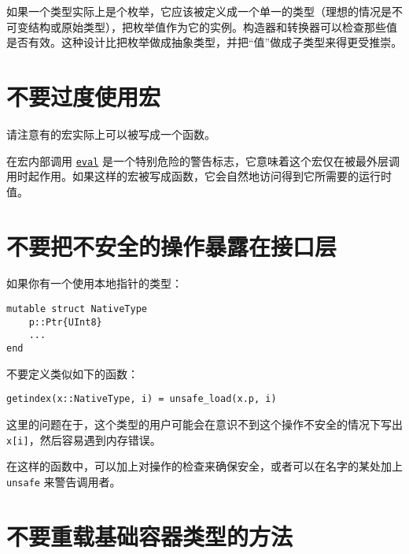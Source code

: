 如果一个类型实际上是个枚举，它应该被定义成一个单一的类型（理想的情况是不可变结构或原始类型），把枚举值作为它的实例。构造器和转换器可以检查那些值是否有效。这种设计比把枚举做成抽象类型，并把“值”做成子类型来得更受推崇。



\hypertarget{678667303123676019}{}


\section{不要过度使用宏}



请注意有的宏实际上可以被写成一个函数。



在宏内部调用 \hyperlink{7507639810592563424}{\texttt{eval}} 是一个特别危险的警告标志，它意味着这个宏仅在被最外层调用时起作用。如果这样的宏被写成函数，它会自然地访问得到它所需要的运行时值。



\hypertarget{9477312169098625763}{}


\section{不要把不安全的操作暴露在接口层}



如果你有一个使用本地指针的类型：




\begin{verbatim}
mutable struct NativeType
    p::Ptr{UInt8}
    ...
end
\end{verbatim}



不要定义类似如下的函数：




\begin{verbatim}
getindex(x::NativeType, i) = unsafe_load(x.p, i)
\end{verbatim}



这里的问题在于，这个类型的用户可能会在意识不到这个操作不安全的情况下写出 \texttt{x[i]}，然后容易遇到内存错误。



在这样的函数中，可以加上对操作的检查来确保安全，或者可以在名字的某处加上 \texttt{unsafe} 来警告调用者。



\hypertarget{11547972187147924005}{}


\section{不要重载基础容器类型的方法}



